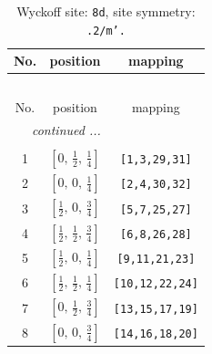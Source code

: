\documentclass[fleqn,8pt]{jsarticle}
\begin{document}
\begin{longtable}{ccc}
\caption{Wyckoff site: {\tt 8d}, site symmetry: {\tt .2/m'.}}
 \\
 \hline \hline
No. & position & mapping \\ \hline \endfirsthead

\multicolumn{2}{l}{\tablename\ \thetable{}} \\
 \hline \hline
No. & position & mapping \\ \hline \endhead

 \hline \hline
\multicolumn{2}{r}{\footnotesize\it continued ...} \\ \endfoot

 \hline \hline
\multicolumn{2}{r}{} \\ \endlastfoot

1 & $\left[ 0,\, \frac{1}{2},\, \frac{1}{4} \right]$ & {\tt [1,3,29,31]} \\ \hline
2 & $\left[ 0,\, 0,\, \frac{1}{4} \right]$ & {\tt [2,4,30,32]} \\ \hline
3 & $\left[ \frac{1}{2},\, 0,\, \frac{3}{4} \right]$ & {\tt [5,7,25,27]} \\ \hline
4 & $\left[ \frac{1}{2},\, \frac{1}{2},\, \frac{3}{4} \right]$ & {\tt [6,8,26,28]} \\ \hline
5 & $\left[ \frac{1}{2},\, 0,\, \frac{1}{4} \right]$ & {\tt [9,11,21,23]} \\ \hline
6 & $\left[ \frac{1}{2},\, \frac{1}{2},\, \frac{1}{4} \right]$ & {\tt [10,12,22,24]} \\ \hline
7 & $\left[ 0,\, \frac{1}{2},\, \frac{3}{4} \right]$ & {\tt [13,15,17,19]} \\ \hline
8 & $\left[ 0,\, 0,\, \frac{3}{4} \right]$ & {\tt [14,16,18,20]} \\
\end{longtable}
\renewcommand{\arraystretch}{1.2}
\end{document}
